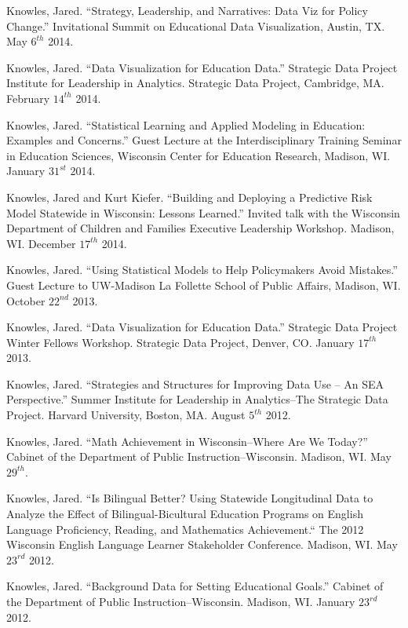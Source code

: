 \documentclass[margin,line]{res}
\begin{document}
\begin{resume}
Knowles, Jared. ``Strategy, Leadership, and Narratives: Data Viz for Policy Change.'' Invitational Summit on Educational Data Visualization, Austin, TX. May $6^{th}$ 2014. 

Knowles, Jared. ``Data Visualization for Education Data.'' Strategic Data Project Institute for Leadership in Analytics. Strategic Data Project, Cambridge, MA. February $14^{th}$ 2014. 

Knowles, Jared. ``Statistical Learning and Applied Modeling in Education: Examples 
and Concerns.'' Guest Lecture at the Interdisciplinary Training Seminar in Education Sciences, Wisconsin Center for Education Research, Madison, WI. January $31^{st}$ 2014.

Knowles, Jared and Kurt Kiefer. ``Building and Deploying a Predictive Risk Model Statewide in Wisconsin: Lessons Learned.'' Invited talk with the 
Wisconsin Department of Children and Families Executive Leadership Workshop. Madison, WI. December $17^{th}$ 2014.

Knowles, Jared. ``Using Statistical Models to Help Policymakers Avoid Mistakes.'' Guest Lecture to UW-Madison La Follette School of Public Affairs, Madison, WI. October $22^{nd}$ 2013.

Knowles, Jared. ``Data Visualization for Education Data.'' Strategic Data Project Winter Fellows Workshop. Strategic Data Project, Denver, CO. January $17^{th}$ 2013. 

Knowles, Jared. ``Strategies and Structures for Improving Data Use -- An SEA Perspective.'' Summer Institute for Leadership in Analytics--The Strategic Data Project. Harvard University, Boston, MA. August $5^{th}$ 2012. 


Knowles, Jared. ``Math Achievement in Wisconsin--Where Are We Today?'' Cabinet of the Department of Public Instruction--Wisconsin. Madison, WI. May $29^{th}$. 

Knowles, Jared. ``Is Bilingual Better? Using Statewide Longitudinal Data to Analyze the Effect of Bilingual-Bicultural Education Programs on English Language Proficiency, Reading, and Mathematics Achievement.`` The 2012 Wisconsin English Language Learner Stakeholder Conference. Madison, WI. May $23^{rd}$ 2012. 

Knowles, Jared. ``Background Data for Setting Educational Goals.'' Cabinet of the Department of Public Instruction--Wisconsin. Madison, WI. January $23^{rd}$ 2012. 


\end{resume}
\end{document}

